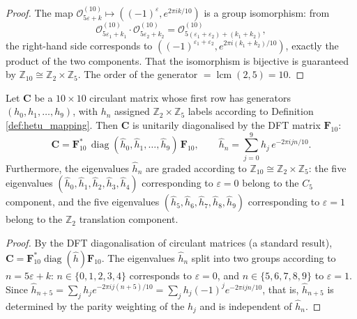 \begin{proof}
The map $\mathcal{O}_{5\varepsilon + k}^{(10)} \mapsto ((-1)^\varepsilon, e^{2\pi i k / 10})$ is a group isomorphism: from
\[
\mathcal{O}_{5\varepsilon_1 + k_1}^{(10)} \cdot \mathcal{O}_{5\varepsilon_2 + k_2}^{(10)} = \mathcal{O}_{5(\varepsilon_1 + \varepsilon_2) + (k_1 + k_2)}^{(10)},
\]
the right-hand side corresponds to $((-1)^{\varepsilon_1 + \varepsilon_2}, e^{2\pi i (k_1 + k_2)/10})$, exactly the product of the two components. That the isomorphism is bijective is guaranteed by $\mathbb{Z}_{10} \cong \mathbb{Z}_2 \times \mathbb{Z}_5$. The order of the generator $= \operatorname{lcm}(2, 5) = 10$.
\end{proof}

\begin{theorem}\label{thm:hetu_circulant}
Let $\mathbf{C}$ be a $10 \times 10$ circulant matrix whose first row has generators $(h_0, h_1, \dots, h_9)$, with $h_n$ assigned $\mathbb{Z}_2 \times \mathbb{Z}_5$ labels according to Definition \ref{def:hetu_mapping}. Then $\mathbf{C}$ is unitarily diagonalised by the DFT matrix $\mathbf{F}_{10}$:
\[
\mathbf{C} = \mathbf{F}_{10}^*\, \operatorname{diag}(\hat{h}_0, \hat{h}_1, \dots, \hat{h}_9)\, \mathbf{F}_{10}, \qquad
\hat{h}_n = \sum_{j=0}^{9} h_j\, e^{-2\pi i j n / 10}.
\]
Furthermore, the eigenvalues $\hat{h}_n$ are graded according to $\mathbb{Z}_{10} \cong \mathbb{Z}_2 \times \mathbb{Z}_5$: the five eigenvalues $(\hat{h}_0, \hat{h}_1, \hat{h}_2, \hat{h}_3, \hat{h}_4)$ corresponding to $\varepsilon = 0$ belong to the $C_5$ component, and the five eigenvalues $(\hat{h}_5, \hat{h}_6, \hat{h}_7, \hat{h}_8, \hat{h}_9)$ corresponding to $\varepsilon = 1$ belong to the $\mathbb{Z}_2$ translation component.
\end{theorem}

\begin{proof}
By the DFT diagonalisation of circulant matrices (a standard result), $\mathbf{C} = \mathbf{F}_{10}^* \operatorname{diag}(\hat{h}) \mathbf{F}_{10}$. The eigenvalues $\hat{h}_n$ split into two groups according to $n = 5\varepsilon + k$: $n \in \{0,1,2,3,4\}$ corresponds to $\varepsilon = 0$, and $n \in \{5,6,7,8,9\}$ to $\varepsilon = 1$. Since $\hat{h}_{n+5} = \sum_j h_j e^{-2\pi i j (n+5)/10} = \sum_j h_j (-1)^j e^{-2\pi i j n/10}$, that is, $\hat{h}_{n+5}$ is determined by the parity weighting of the $h_j$ and is independent of $\hat{h}_n$.
\end{proof}

